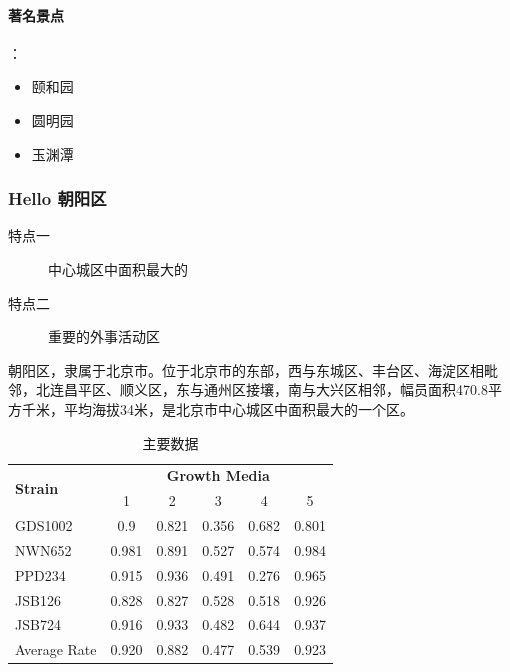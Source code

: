 \documentclass[
    UTF8,
    11pt,
    oneside,
    headinclude,
    footinclude
]{ctexart}
\begin{document}
\paragraph{著名景点}：
\begin{itemize}
    \item 颐和园 
    \item 圆明园 
    \item 玉渊潭 
\end{itemize}
  
\subsubsection{Hello 朝阳区}
\begin{description}
    \item[特点一] 中心城区中面积最大的
    \item[特点二] 重要的外事活动区
\end{description}

朝阳区，隶属于北京市。位于北京市的东部，西与东城区、丰台区、海淀区相毗邻，北连昌平区、顺义区，东与通州区接壤，南与大兴区相邻，幅员面积470.8平方千米，平均海拔34米，是北京市中心城区中面积最大的一个区。

\begin{table}[htbp]                %
\centering                         %
\begin{tabular}{l c c c c c}       %
\toprule[1.5pt]                      %
\multirow{2}{*}{\textbf{Strain}} & \multicolumn{5}{c}{\textbf{Growth Media}} \\
\cmidrule(l){2-6} 
& 1 & 2 & 3 & 4 & 5\\ %
\midrule %
GDS1002& 0.9 & 0.821 & 0.356 & 0.682 & 0.801\\ %
NWN652 & 0.981 & 0.891 & 0.527 & 0.574 & 0.984\\ %
PPD234 & 0.915 & 0.936 & 0.491 & 0.276 & 0.965\\ %
JSB126 & 0.828 & 0.827 & 0.528 & 0.518 & 0.926\\ %
JSB724 & 0.916 & 0.933 & 0.482 & 0.644 & 0.937\\ %
\midrule %
\midrule %
Average Rate & 0.920 & 0.882 & 0.477 & 0.539 & 0.923\\ %
\bottomrule[1.5pt]              %
\end{tabular}

\caption{主要数据} %
\label{tab:template} %
\end{table}
\end{document}
